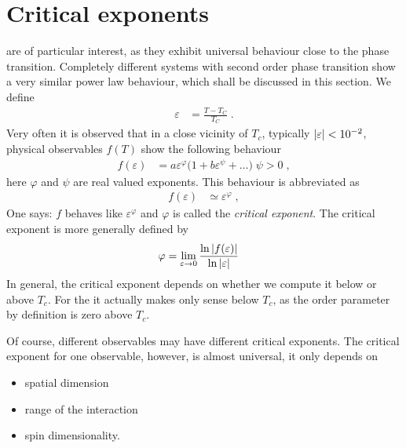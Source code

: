 \section{Critical exponents\label{sec:critical:exponents}}
 are of particular interest, as they exhibit universal behaviour close 
to the phase transition. Completely different systems with second order phase transition
show a very similar power law behaviour, which shall be discussed in this section. 
We define 
%
\begin{align*}
\varepsilon &=\frac{T-T_{C}}{T_{C}}\;.
\end{align*}
%
Very often it is observed that in a close vicinity of $T_{c}$, typically
$\abs{\varepsilon} < 10^{-2}$,
%
physical observables $f(T)$ show the following behaviour
%
\begin{align*}
f(\varepsilon) &= a \varepsilon^{\varphi} \big( 1 +  b \varepsilon^{\psi} +\ldots\big)\;\psi>0\;,
\end{align*}
%
here $\varphi$ and $\psi$ are real valued exponents. This behaviour is abbreviated as
%
\begin{align}
f(\varepsilon) &\simeq \varepsilon^{\varphi}\;,
\end{align}
%
One says: $f$ behaves like $\varepsilon^{\varphi}$ and $\varphi$ is called the {\em critical exponent}.
The critical exponent is more generally defined by
%
\begin{align}\label{def:critical:exponent}
\varphi &= \lim_{\varepsilon\to 0} \frac{
\ln \abs{f(\varepsilon)} }{\ln \abs{\varepsilon}}
\end{align}
%
In general, the critical exponent depends on whether we compute it below or above $T_{c}$.
For the  it actually makes only sense below  $T_{c}$, as the order parameter
by definition is zero above $T_{c}$.

Of course, different observables may have different critical exponents. The critical exponent for 
one observable, however, is almost universal, it only depends on
\begin{itemize}
	\item spatial dimension
	\item range of the interaction
	\item spin dimensionality.
\end{itemize}

